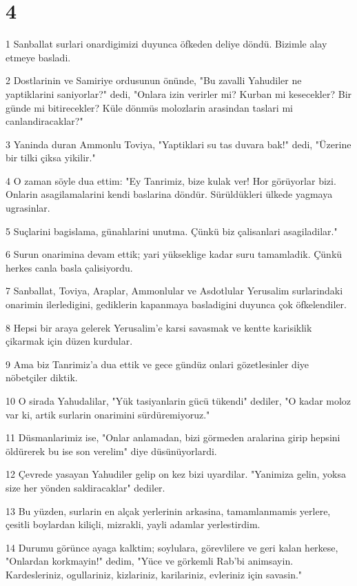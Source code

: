 \chapter{4}

\par 1 Sanballat surlari onardigimizi duyunca öfkeden deliye döndü. Bizimle alay etmeye basladi.
\par 2 Dostlarinin ve Samiriye ordusunun önünde, "Bu zavalli Yahudiler ne yaptiklarini saniyorlar?" dedi, "Onlara izin verirler mi? Kurban mi kesecekler? Bir günde mi bitirecekler? Küle dönmüs molozlarin arasindan taslari mi canlandiracaklar?"
\par 3 Yaninda duran Ammonlu Toviya, "Yaptiklari su tas duvara bak!" dedi, "Üzerine bir tilki çiksa yikilir."
\par 4 O zaman söyle dua ettim: "Ey Tanrimiz, bize kulak ver! Hor görüyorlar bizi. Onlarin asagilamalarini kendi baslarina döndür. Sürüldükleri ülkede yagmaya ugrasinlar.
\par 5 Suçlarini bagislama, günahlarini unutma. Çünkü biz çalisanlari asagiladilar."
\par 6 Surun onarimina devam ettik; yari yükseklige kadar suru tamamladik. Çünkü herkes canla basla çalisiyordu.
\par 7 Sanballat, Toviya, Araplar, Ammonlular ve Asdotlular Yerusalim surlarindaki onarimin ilerledigini, gediklerin kapanmaya basladigini duyunca çok öfkelendiler.
\par 8 Hepsi bir araya gelerek Yerusalim'e karsi savasmak ve kentte karisiklik çikarmak için düzen kurdular.
\par 9 Ama biz Tanrimiz'a dua ettik ve gece gündüz onlari gözetlesinler diye nöbetçiler diktik.
\par 10 O sirada Yahudalilar, "Yük tasiyanlarin gücü tükendi" dediler, "O kadar moloz var ki, artik surlarin onarimini sürdüremiyoruz."
\par 11 Düsmanlarimiz ise, "Onlar anlamadan, bizi görmeden aralarina girip hepsini öldürerek bu ise son verelim" diye düsünüyorlardi.
\par 12 Çevrede yasayan Yahudiler gelip on kez bizi uyardilar. "Yanimiza gelin, yoksa size her yönden saldiracaklar" dediler.
\par 13 Bu yüzden, surlarin en alçak yerlerinin arkasina, tamamlanmamis yerlere, çesitli boylardan kiliçli, mizrakli, yayli adamlar yerlestirdim.
\par 14 Durumu görünce ayaga kalktim; soylulara, görevlilere ve geri kalan herkese, "Onlardan korkmayin!" dedim, "Yüce ve görkemli Rab'bi animsayin. Kardesleriniz, ogullariniz, kizlariniz, karilariniz, evleriniz için savasin."

